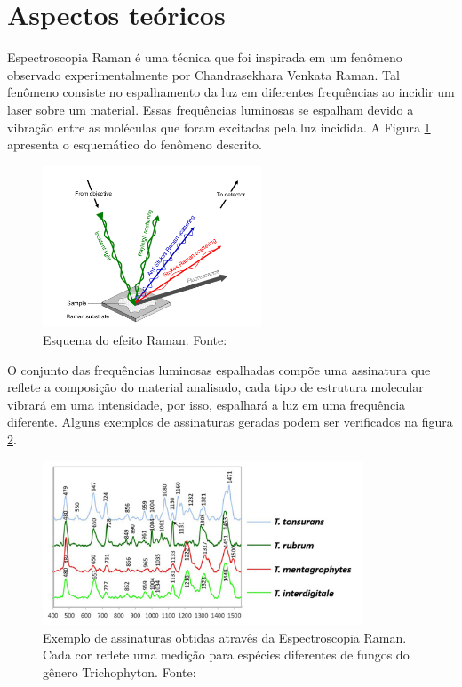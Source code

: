 \documentclass[conference,peerreview]{IEEEtran}
\begin{document}
\section{Aspectos teóricos}

Espectroscopia Raman é uma técnica que foi inspirada em um fenômeno observado experimentalmente por Chandrasekhara Venkata Raman. Tal fenômeno consiste no espalhamento da luz em diferentes frequências ao incidir um laser sobre um material. Essas frequências luminosas se espalham devido a vibração entre as moléculas que foram excitadas pela luz incidida. A Figura \ref{incidencia_luminosa_exemplo} apresenta o esquemático do fenômeno descrito.

\begin{figure}[ht]
\centering
\includegraphics[width=6.5cm]{incidencia_luminosa_exemplo}
\caption{Esquema do efeito Raman. Fonte: \cite{Butler2016}}
\label{incidencia_luminosa_exemplo}
\end{figure}

O conjunto das frequências luminosas espalhadas compõe uma assinatura que reflete a composição do material analisado, cada tipo de estrutura molecular vibrará em uma intensidade, por isso, espalhará a luz em uma frequência diferente. Alguns exemplos de assinaturas geradas podem ser verificados na figura \ref{assinatura_raman_exemplo}.

\begin{figure}[ht]
\centering
\includegraphics[width=9.5cm]{assinatura_raman_exemplo}
\caption{Exemplo de assinaturas obtidas atravês da Espectroscopia Raman. Cada cor reflete uma medição para espécies diferentes de fungos do gênero Trichophyton. Fonte: \cite{Pankin2018}}
\label{assinatura_raman_exemplo}
\end{figure}
\end{document}
